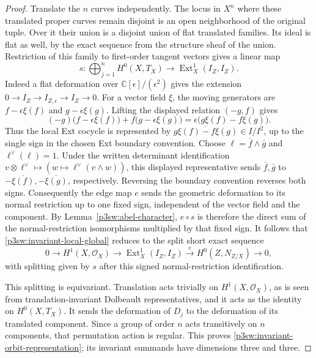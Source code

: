 \documentclass[11pt]{article}
\numberwithin{equation}{section}
\begin{document}
\begin{proof}
Translate the \(n\) curves independently.  The locus in \(X^n\) where
these translated proper curves remain disjoint is an open neighborhood
of the original tuple.  Over it their union is a disjoint union of flat
translated families.  Its ideal is flat as well, by the exact sequence
from the structure sheaf of the union.  Restriction of this family to
first-order tangent vectors gives a linear map
\[
 s:\bigoplus_{j=1}^nH^0(X,T_X)
   \longrightarrow\operatorname{Ext}^1_X(I_Z,I_Z).
\]
Indeed a flat deformation over \(\mathbb C[\epsilon]/(\epsilon^2)\)
gives the extension
\(0\to I_Z\to I_{Z,\epsilon}\to I_Z\to0\).
For a vector field \(\xi\), the moving generators are
\(f-\epsilon\xi(f)\) and \(g-\epsilon\xi(g)\).  Lifting the displayed
relation \((-g,f)\) gives
\[
 (-g)\bigl(f-\epsilon\xi(f)\bigr)
 +f\bigl(g-\epsilon\xi(g)\bigr)
 =\epsilon\bigl(g\xi(f)-f\xi(g)\bigr).
\]
Thus the local Ext cocycle is represented by
\(\overline{g\xi(f)-f\xi(g)}\in I/I^2\), up to the single sign in the
chosen Ext boundary convention.  Choose \(\ell=\bar f\wedge\bar g\) and
\(\ell^\vee(\ell)=1\).  Under the written determinant
identification \(v\otimes\ell^\vee\mapsto
(w\mapsto\ell^\vee(v\wedge w))\), this displayed representative sends
\(\bar f,\bar g\) to \(-\overline{\xi(f)},-\overline{\xi(g)}\),
respectively.  Reversing the boundary convention reverses both signs.
Consequently the edge map \(e\) sends the geometric deformation to its
normal restriction up to one fixed sign, independent of the vector field
and the component.  By Lemma~\ref{p3sw:abel-character}, \(e\circ s\)
is therefore the direct sum of the normal-restriction isomorphisms
multiplied by that fixed sign.  It follows that
\eqref{p3sw:invariant-local-global} reduces to the split short exact
sequence
\[
 0\longrightarrow H^1(X,\mathcal O_X)
 \longrightarrow\operatorname{Ext}^1_X(I_Z,I_Z)
 \xrightarrow{e}H^0(Z,N_{Z/X})\longrightarrow0,
\]
with splitting given by \(s\) after this signed normal-restriction
identification.

This splitting is equivariant.  Translation acts trivially on
\(H^1(X,\mathcal O_X)\), as is seen from translation-invariant Dolbeault
representatives, and it acts as the identity on \(H^0(X,T_X)\).
It sends the deformation of \(D_j\) to the deformation of its translated
component.  Since a group of order \(n\) acts transitively on \(n\)
components, that permutation action is regular.  This proves
\eqref{p3sw:invariant-orbit-representation}; its invariant summands have
dimensions three and three.


\end{proof}
\end{document}
